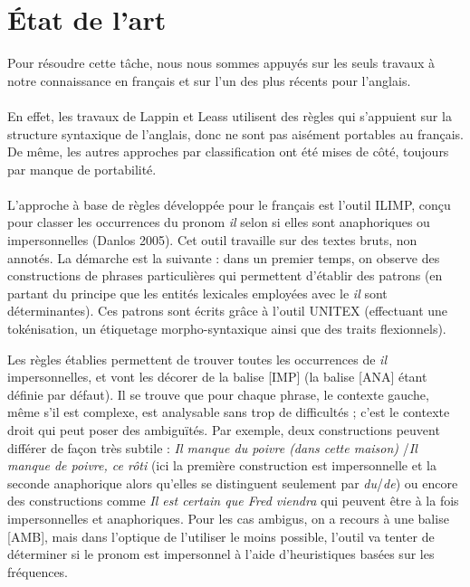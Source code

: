 \documentclass[a4paper,12pt]{article}
\begin{document}
\section{État de l'art}

Pour résoudre cette tâche, nous nous sommes appuyés sur les seuls travaux à notre connaissance en français et sur l'un des plus récents pour l'anglais.

\paragraph{}
En effet, les travaux de Lappin et Leass utilisent des règles qui s'appuient sur la structure syntaxique de l'anglais, donc ne sont pas aisément portables au français. De même, les autres approches par classification ont été mises de côté, toujours par manque de portabilité.

\paragraph{}
L'approche à base de règles développée pour le français est l'outil ILIMP, conçu pour classer les occurrences du pronom \og{}\textit{il}\fg{} selon si elles sont anaphoriques ou impersonnelles (Danlos 2005). Cet outil travaille sur des textes bruts, non annotés.
La démarche est la suivante : dans un premier temps, on observe des constructions de phrases particulières qui permettent d'établir des patrons (en partant du principe que les entités lexicales employées avec le \og{}\textit{il}\fg{} sont déterminantes). Ces patrons sont écrits grâce à l'outil UNITEX (effectuant une tokénisation, un étiquetage morpho-syntaxique ainsi que des traits flexionnels).

Les règles établies permettent de trouver toutes les occurrences de \og{}\textit{il}\fg{} impersonnelles, et vont les décorer de la balise [IMP] (la balise [ANA] étant définie par défaut).
Il se trouve que pour chaque phrase, le contexte gauche, même s'il est complexe, est analysable sans trop de difficultés ; c'est le contexte droit qui peut poser des ambiguïtés. Par exemple, deux constructions peuvent différer de façon très subtile : \og \textit{Il manque du poivre (dans cette maison)} \fg{}/\og \textit{Il manque de poivre, ce rôti} \fg{} (ici la première construction est impersonnelle et la seconde anaphorique alors qu'elles se distinguent seulement par \textit{du}/\textit{de}) ou encore des constructions comme \og \textit{Il est certain que Fred viendra} \fg{}  qui peuvent être à la fois impersonnelles et anaphoriques. 
Pour les cas ambigus, on a recours à une balise [AMB], mais dans l'optique de l'utiliser le moins possible, l'outil va tenter de déterminer si le pronom est impersonnel à l'aide d'heuristiques basées sur les fréquences.
\end{document}
